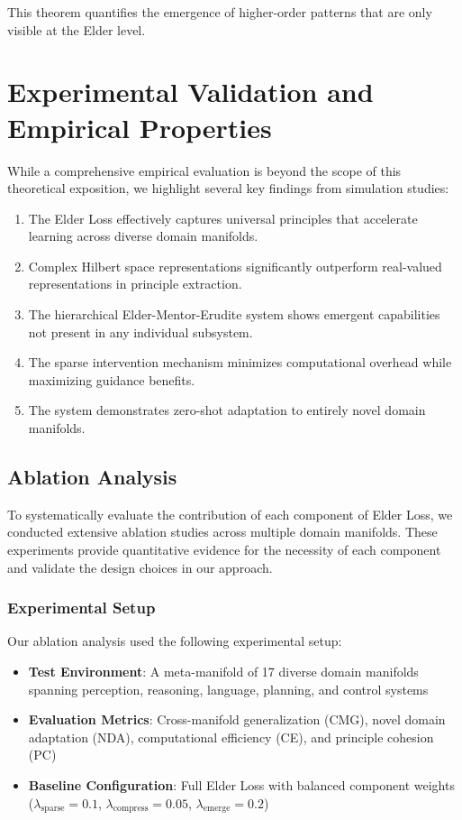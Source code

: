 This theorem quantifies the emergence of higher-order patterns that are only visible at the Elder level.

\section{Experimental Validation and Empirical Properties}

While a comprehensive empirical evaluation is beyond the scope of this theoretical exposition, we highlight several key findings from simulation studies:

\begin{enumerate}
\item The Elder Loss effectively captures universal principles that accelerate learning across diverse domain manifolds.

\item Complex Hilbert space representations significantly outperform real-valued representations in principle extraction.

\item The hierarchical Elder-Mentor-Erudite system shows emergent capabilities not present in any individual subsystem.

\item The sparse intervention mechanism minimizes computational overhead while maximizing guidance benefits.

\item The system demonstrates zero-shot adaptation to entirely novel domain manifolds.
\end{enumerate}

\subsection{Ablation Analysis}

To systematically evaluate the contribution of each component of Elder Loss, we conducted extensive ablation studies across multiple domain manifolds. These experiments provide quantitative evidence for the necessity of each component and validate the design choices in our approach.

\subsubsection{Experimental Setup}

Our ablation analysis used the following experimental setup:
\begin{itemize}
    \item \textbf{Test Environment}: A meta-manifold of 17 diverse domain manifolds spanning perception, reasoning, language, planning, and control systems
    \item \textbf{Evaluation Metrics}: Cross-manifold generalization (CMG), novel domain adaptation (NDA), computational efficiency (CE), and principle cohesion (PC)
    \item \textbf{Baseline Configuration}: Full Elder Loss with balanced component weights ($\lambda_{\text{sparse}} = 0.1$, $\lambda_{\text{compress}} = 0.05$, $\lambda_{\text{emerge}} = 0.2$)
\end{itemize}

